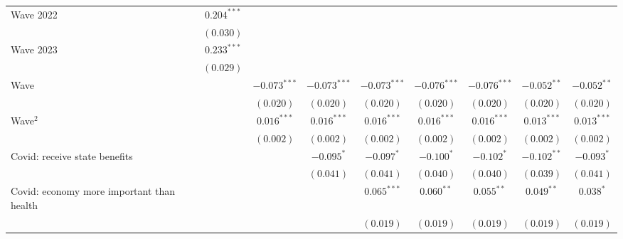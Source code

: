 \documentclass[
]{article}
\begin{document}
\begin{table}
{\begin{center}
{\begin{tabular}{l c c c c c c c c}
\quad Wave 2022                             & $0.204^{***}$  &                &                &                &                &                &                &                \\
                                            & $(0.030)$      &                &                &                &                &                &                &                \\
\quad Wave 2023                             & $0.233^{***}$  &                &                &                &                &                &                &                \\
                                            & $(0.029)$      &                &                &                &                &                &                &                \\
Wave                                        &                & $-0.073^{***}$ & $-0.073^{***}$ & $-0.073^{***}$ & $-0.076^{***}$ & $-0.076^{***}$ & $-0.052^{**}$  & $-0.052^{**}$  \\
                                            &                & $(0.020)$      & $(0.020)$      & $(0.020)$      & $(0.020)$      & $(0.020)$      & $(0.020)$      & $(0.020)$      \\
Wave$^2$                                    &                & $0.016^{***}$  & $0.016^{***}$  & $0.016^{***}$  & $0.016^{***}$  & $0.016^{***}$  & $0.013^{***}$  & $0.013^{***}$  \\
                                            &                & $(0.002)$      & $(0.002)$      & $(0.002)$      & $(0.002)$      & $(0.002)$      & $(0.002)$      & $(0.002)$      \\
Covid: receive state benefits               &                &                & $-0.095^{*}$   & $-0.097^{*}$   & $-0.100^{*}$   & $-0.102^{*}$   & $-0.102^{**}$  & $-0.093^{*}$   \\
                                            &                &                & $(0.041)$      & $(0.041)$      & $(0.040)$      & $(0.040)$      & $(0.039)$      & $(0.041)$      \\
Covid: economy more important than health   &                &                &                & $0.065^{***}$  & $0.060^{**}$   & $0.055^{**}$   & $0.049^{**}$   & $0.038^{*}$    \\
                                            &                &                &                & $(0.019)$      & $(0.019)$      & $(0.019)$      & $(0.019)$      & $(0.019)$      \\

\end{tabular}}
\end{center}}
\end{table}
\end{document}
